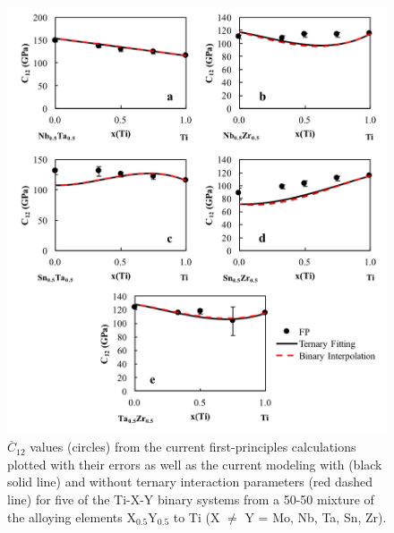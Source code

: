 \pagebreak
\begin{figure}[H]
	\centering
	\includegraphics[width=\textwidth]{Chapter-6/Figures/tixyc122.png}
	\caption{$\overline{C}_{12}$ values (circles) from the current first-principles calculations plotted with their errors as well as the current modeling with (black solid line) and without ternary interaction parameters (red dashed line) for five of the Ti-X-Y binary systems from a 50-50 mixture of the alloying elements X$_{0.5}$Y$_{0.5}$ to Ti (X $\neq$ Y = Mo, Nb, Ta, Sn, Zr).}
	\label{Ch6-figure:tixyc12_2}
\end{figure}

